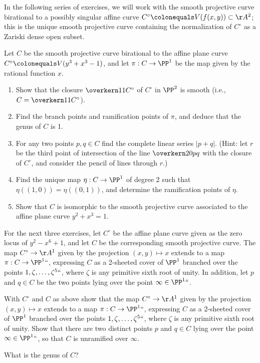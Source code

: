 In the following series of exercises, we will work with the
smooth projective curve birational 
to a possibly 
%
singular affine curve
%
$C^\circ \colonequals V(f(x,y)) \subset \AA^2$; this is the unique smooth
projective curve containing the normalization of $C^\circ$ as a
Zariski dense open subset.

\begin{exercise}
\def\ovCcirc{\overkern11{C^\circ}}
Let $C$ be the smooth projective curve birational to the affine plane curve $C^\circ \colonequals V(y^3 +x^3 - 1)$, and let $\pi : C \to \PP^1$ be the map given by the rational function $x$.
\begin{enumerate}
\item Show that the closure $\ovCcirc$ of $C^\circ$ in $\PP^2$ is smooth (i.e., $C = \ovCcirc$). 
\item Find the 
branch points and ramification points
of $\pi$, and deduce that the genus of $C$ is 1.
\item For any two points $p, q \in C$ find the complete linear series
  $|p+q|$. (Hint: let $r$ be the third point of intersection of the
  line $\overkern20{pq}$ with the closure of $C^\circ$, and consider the
  pencil of lines through $r$.) 
\item Find the unique 
map $\eta : C \to \PP^1$ of degree 2 such that $\eta((1,0)) = \eta((0,1))$, 
and determine the ramification points of $\eta$.
\item Show that $C$ is isomorphic to the smooth projective curve associated to the affine plane curve $y^2 +x^3 = 1$.
\end{enumerate}
\end{exercise}

For the next three exercises, let $C^\circ$ be the affine plane curve
given as the zero locus of $y^2 - x^6 +1$, and let $C$ be the
corresponding smooth projective curve. 
The map $C^\circ \to
\AA^1$ given by the projection $(x,y) \mapsto x$ extends to a map $\pi
: C \to \PP^1` `$, expressing $C$ as a 2-sheeted cover of $\PP^1$
branched over the points $1, \zeta, \dots, \zeta^5` `$, where $\zeta$
is any primitive sixth root of unity. In addition, let $p$ and $q \in
C$ be the two points lying over the point $\infty \in \PP^1` `$.

\begin{exercise}\label{hyperelliptic curve a}
With $C^\circ$ and $C$  as above show  that the map $C^\circ \to
\AA^1$ given by the projection $(x,y) \mapsto x$ extends to a map $\pi
: C \to \PP^1` `$, expressing $C$ as a 2-sheeted cover of $\PP^1$
branched over the points $1, \zeta, \dots, \zeta^5` `$, where $\zeta$
is any primitive sixth root of unity. Show that there are two distinct
points $p$ and $q \in C$  lying over the point $\infty \in \PP^1` `$,
so that $C$ is unramified over $\infty$.

What is the genus of $C$?
\end{exercise}

